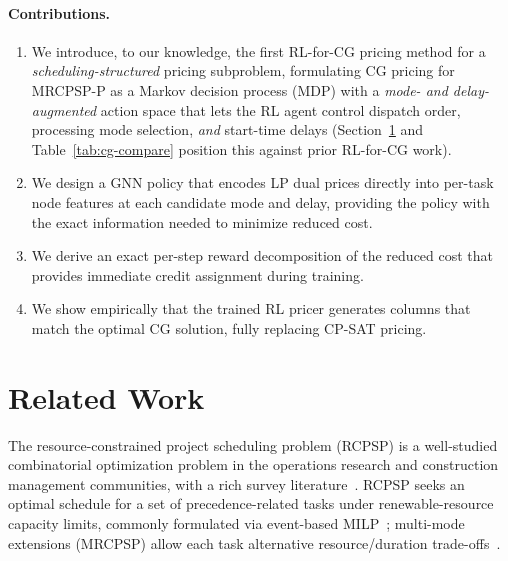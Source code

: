 \documentclass[11pt]{article}
\begin{document}
\paragraph{Contributions.}
\begin{enumerate}
    \item We introduce, to our knowledge, the first RL-for-CG pricing method for a \emph{scheduling-structured} pricing subproblem, formulating CG pricing for MRCPSP-P as a Markov decision process (MDP) with a \emph{mode- and delay-augmented} action space that lets the RL agent control dispatch order, processing mode selection, \emph{and} start-time delays (Section~\ref{sec:related} and Table~\ref{tab:cg-compare} position this against prior RL-for-CG work).
    \item We design a GNN policy that encodes LP dual prices directly into per-task node features at each candidate mode and delay, providing the policy with the exact information needed to minimize reduced cost.
    \item We derive an exact per-step reward decomposition of the reduced cost that provides immediate credit assignment during training.
    \item We show empirically that the trained RL pricer generates columns that match the optimal CG solution, fully replacing CP-SAT pricing.
\end{enumerate}

\section{Related Work}\label{sec:related}
The resource-constrained project scheduling problem (RCPSP) is a well-studied
combinatorial optimization problem in the operations research and
construction management communities, with a rich survey
literature~\citep{herroelen1998rcpsp,hartmann2022updated,khajesaeedi2025review}.
RCPSP seeks an optimal schedule for a set of precedence-related tasks under
renewable-resource capacity limits, commonly formulated via event-based
MILP~\citep{kone2011milp}; multi-mode extensions (MRCPSP) allow each task
alternative resource/duration trade-offs~\citep{hartmann2010survey,cheng2015splitting}.
\end{document}
